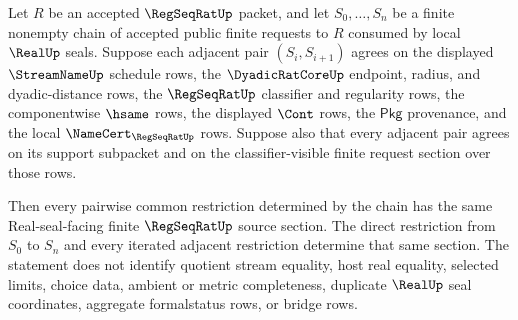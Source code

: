 \begin{theorem}
\label{thm:regseqrat-finite-request-intersection-chain-stability}
Let $R$ be an accepted $\RegSeqRatUp$ packet, and let
$S_0,\ldots,S_n$ be a finite nonempty chain of accepted public finite
requests to $R$ consumed by local $\RealUp$ seals. Suppose each adjacent pair
$(S_i,S_{i+1})$ agrees on the displayed $\StreamNameUp$ schedule rows, the
$\DyadicRatCoreUp$ endpoint, radius, and dyadic-distance rows, the
$\RegSeqRatUp$ classifier and regularity rows, the componentwise $\hsame$
rows, the displayed $\Cont$ rows, the $\mathsf{Pkg}$ provenance, and the
local $\NameCert_{\RegSeqRatUp}$ rows. Suppose also that every adjacent pair
agrees on its support subpacket and on the classifier-visible finite request
section over those rows.

Then every pairwise common restriction determined by the chain has the same
Real-seal-facing finite $\RegSeqRatUp$ source section. The direct restriction
from $S_0$ to $S_n$ and every iterated adjacent restriction determine that
same section. The statement does not identify quotient stream equality, host
real equality, selected limits, choice data, ambient or metric completeness,
duplicate $\RealUp$ seal coordinates, aggregate formalstatus rows, or bridge
rows.
\end{theorem}
